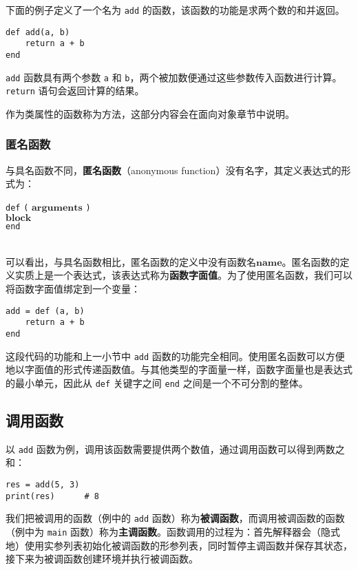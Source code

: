 下面的例子定义了一个名为 \texttt{add} 的函数，该函数的功能是求两个数的和并返回。
\begin{lstlisting}[language=berry, numbers=none]
def add(a, b)
    return a + b
end
\end{lstlisting}
\texttt{add} 函数具有两个参数 \texttt{a} 和 \texttt{b}，两个被加数便通过这些参数传入函数进行计算。\texttt{return} 语句会返回计算的结果。

作为类属性的函数称为方法，这部分内容会在面向对象章节中说明。

\subsubsection{匿名函数}

与具名函数不同，\textbf{匿名函数}（anonymous function）没有名字，其定义表达式的形式为：
\begin{algorithm}
    \texttt{def} \texttt{(} $\bm{arguments}$ \texttt{)} \\
        \qquad $\bm{block}$ \\
    \texttt{end}
\end{algorithm}\vspace{-0.6em}\\
可以看出，与具名函数相比，匿名函数的定义中没有函数名$\bm{name}$。匿名函数的定义实质上是一个表达式，该表达式称为\textbf{函数字面值}。为了使用匿名函数，我们可以将函数字面值绑定到一个变量：
\begin{lstlisting}[language=berry, numbers=none]
add = def (a, b)
    return a + b
end
\end{lstlisting}
这段代码的功能和上一小节中 \texttt{add} 函数的功能完全相同。使用匿名函数可以方便地以字面值的形式传递函数值。与其他类型的字面量一样，函数字面量也是表达式的最小单元，因此从 \texttt{def} 关键字之间 \texttt{end} 之间是一个不可分割的整体。

\subsection{调用函数}

以 \texttt{add} 函数为例，调用该函数需要提供两个数值，通过调用函数可以得到两数之和：
\begin{lstlisting}[language=berry, numbers=none]
res = add(5, 3)
print(res)      # 8
\end{lstlisting}
我们把被调用的函数（例中的 \texttt{add} 函数）称为\textbf{被调函数}，而调用被调函数的函数（例中为 \texttt{main} 函数）称为\textbf{主调函数}。函数调用的过程为：首先解释器会（隐式地）使用实参列表初始化被调函数的形参列表，同时暂停主调函数并保存其状态，接下来为被调函数创建环境并执行被调函数。

